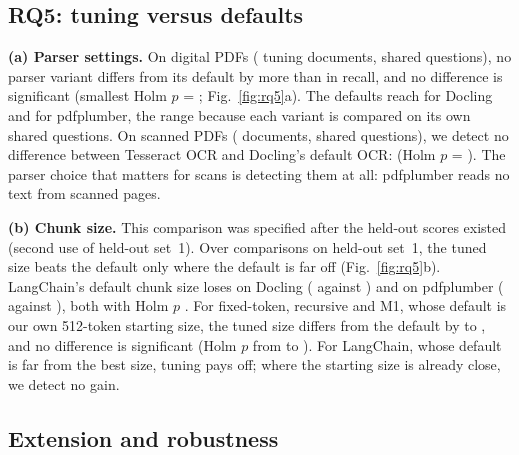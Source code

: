 \subsection{RQ5: tuning versus defaults}\label{sec:rq5}



\textbf{(a) Parser settings.} On digital PDFs
(\RQfiveADigitalDocuments{} tuning documents, \RQfiveADigitalQuestions{} shared
questions), no parser variant differs from its default by more than
\RQfiveADigitalMaxAbsDiff{} in recall, and no difference is significant (smallest Holm $p$ = \RQfiveADigitalMinHolm{};
Fig.~\ref{fig:rq5}a). The defaults reach \RQfiveADigitalDoclingRecall{} for
Docling and \RQfiveADigitalPdfplumberRecall{} for pdfplumber, the range
because each variant is compared on its own shared questions. On scanned PDFs
(\RQfiveAScannedDocuments{} documents, \RQfiveAScannedQuestions{} shared
questions), we detect no difference between Tesseract OCR and Docling's default OCR:
\RQfiveAScannedDiff{} \RQfiveAScannedCI{} (Holm $p$ =
\RQfiveAScannedHolm{}). The parser choice that matters for scans is
detecting them at all: pdfplumber reads no text from scanned pages.

\textbf{(b) Chunk size.} This comparison was specified after the held-out scores existed (second use of
held-out set~1). Over \RQfiveBComparisons{} comparisons on held-out
set~1, the tuned size beats the default only where the default is far off
(Fig.~\ref{fig:rq5}b). LangChain's default chunk size loses
\RQfiveBLangchainRecursiveDoclingDiff{}
\RQfiveBLangchainRecursiveDoclingCI{} on Docling
(\RQfiveBLangchainRecursiveDoclingDefault{} against
\RQfiveBLangchainRecursiveDoclingTuned{}) and
\RQfiveBLangchainRecursivePdfplumberDiff{}
\RQfiveBLangchainRecursivePdfplumberCI{} on pdfplumber
(\RQfiveBLangchainRecursivePdfplumberDefault{} against
\RQfiveBLangchainRecursivePdfplumberTuned{}), both with Holm $p$
\RQfiveBLangchainRecursiveDoclingHolm{}. For fixed-token, recursive and M1, whose default is our own 512-token starting
size, the tuned size differs from the default by
\RQfiveBRecursiveDoclingDiff{} to \RQfiveBMethodOneTreePdfplumberDiff{}, and
no difference is significant (Holm $p$ from
\RQfiveBFixedTokenPdfplumberHolm{} to \RQfiveBMethodOneTreeDoclingHolm{}).
For LangChain, whose default is far from the best size, tuning pays off; where
the starting size is already close, we detect no gain.

\subsection{Extension and robustness}\label{sec:extension}

